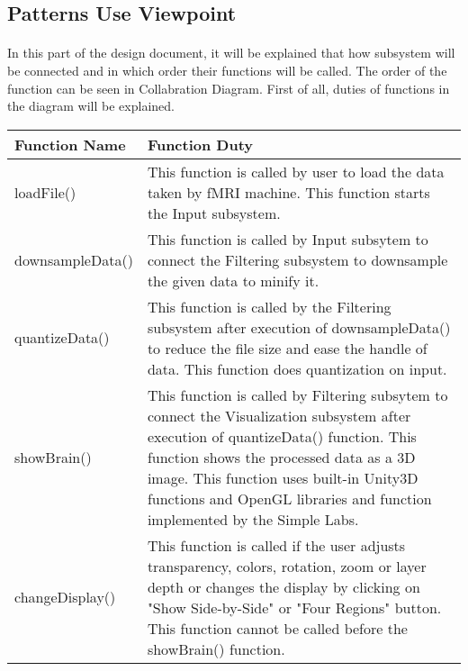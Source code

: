 
\subsection{Patterns Use Viewpoint}
\paragraph{}
\normalsize
    In this part of the design document, it will be explained that how subsystem will be connected and in which order their functions will be called. The order of the function can be seen in Collabration Diagram. First of all, duties of functions in the diagram will be explained.\\
    
    \begin{tabular}{|p{4cm}|p{12cm}|}
     	\hline
        	\textbf{Function Name} & \textbf{Function Duty} \\
        \hline
            loadFile() & This function is called by user to load the data taken by fMRI machine. This function starts the Input subsystem.\\
        \hline
            downsampleData() & This function is called by Input subsytem to connect the Filtering subsystem to downsample the given data to minify it.\\
        \hline
            quantizeData() & This function is called by the Filtering subsystem after execution of downsampleData() to reduce the file size and ease the handle of data. This function does quantization on input.\\
        \hline
            showBrain() & This function is called by Filtering subsytem to connect the Visualization subsystem after execution of quantizeData() function. This function shows the processed data as a 3D image. This function uses built-in Unity3D functions and OpenGL libraries and function implemented by the Simple Labs.\\
        \hline
        	changeDisplay() & This function is called if the user adjusts transparency, colors, rotation, zoom or layer depth or changes the display by clicking on "Show Side-by-Side" or "Four Regions" button. This function cannot be called before the showBrain() function.\\
        \hline
    \end{tabular}
    
